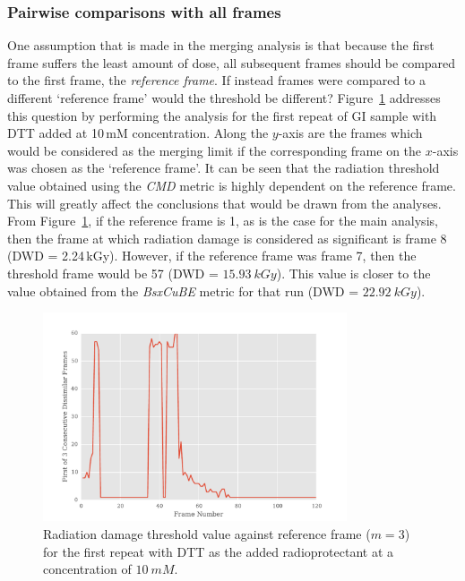 \subsubsection{Pairwise comparisons with all frames}
\label{subs:Pairwise comparisons with all frames}
One assumption that is made in the merging analysis is that because the first frame suffers the least amount of dose, all subsequent frames should be compared to the first frame, the \textit{reference frame}.
If instead frames were compared to a different `reference frame' would the threshold be different?
Figure~\ref{fig:First n diff frames - DTT} addresses this question by performing the analysis for the first repeat of GI sample with DTT added at 10$\,$mM concentration.
Along the $y$-axis are the frames which would be considered as the merging limit if the corresponding frame on the $x$-axis was chosen as the `reference frame'.
It can be seen that the radiation threshold value obtained using the \textit{CMD} metric is highly dependent on the reference frame.
This will greatly affect the conclusions that would be drawn from the analyses.
From Figure~\ref{fig:First n diff frames - DTT}, if the reference frame is 1, as is the case for the main analysis, then the frame at which radiation damage is considered as significant is frame 8 (DWD = 2.24$\,$kGy).
However, if the reference frame was frame 7, then the threshold frame would be 57 (DWD = $15.93\ kGy$).
This value is closer to the value obtained from the \textit{BsxCuBE} metric for that run (DWD = $22.92\ kGy$).
\begin{figure}
    \centering
    \includegraphics[width=0.8\textwidth]{figures/saxs/dtt_first_n_plot.pdf}
    \caption{Radiation damage threshold value against reference frame ($m = 3$) for the first repeat with DTT as the added radioprotectant at a concentration of $10\ mM$.}
    \label{fig:First n diff frames - DTT}
\end{figure}

